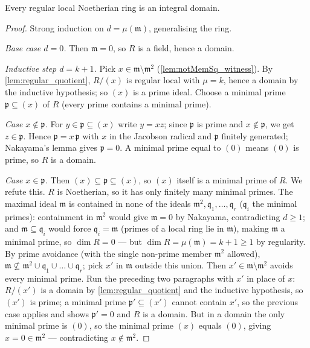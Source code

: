 \begin{theorem}
  \label{thm:regular_isDomain}
  \leanok
  Every regular local Noetherian ring is an integral domain.
\end{theorem}
\begin{proof}
  \leanok
  Strong induction on \(d = \mu(\mathfrak m)\), generalising the ring.

  \emph{Base case \(d = 0\).} Then \(\mathfrak m = 0\), so \(R\) is a field, hence a
  domain.

  \emph{Inductive step \(d = k + 1\).} Pick \(x \in \mathfrak m \setminus \mathfrak m^2\)
  (\ref{lem:notMemSq_witness}). By \ref{lem:regular_quotient}, \(R/(x)\) is regular
  local with \(\mu = k\), hence a domain by the inductive hypothesis; so \((x)\) is a
  prime ideal. Choose a minimal prime \(\mathfrak p \subseteq (x)\) of \(R\) (every
  prime contains a minimal prime).

  \emph{Case \(x \notin \mathfrak p\).} For \(y \in \mathfrak p \subseteq (x)\) write
  \(y = xz\); since \(\mathfrak p\) is prime and \(x \notin \mathfrak p\), we get
  \(z \in \mathfrak p\). Hence \(\mathfrak p = x\,\mathfrak p\) with
  \(x\) in the Jacobson radical and \(\mathfrak p\) finitely generated; Nakayama's lemma
  gives \(\mathfrak p = 0\). A minimal prime equal to \((0)\) means \((0)\) is prime, so
  \(R\) is a domain.

  \emph{Case \(x \in \mathfrak p\).} Then \((x) \subseteq \mathfrak p \subseteq (x)\),
  so \((x)\) itself is a minimal prime of \(R\). We refute this. \(R\) is Noetherian, so
  it has only finitely many minimal primes. The maximal ideal \(\mathfrak m\) is
  contained in none of the ideals \(\mathfrak m^2, \mathfrak q_1, \dots, \mathfrak q_r\)
  (\(\mathfrak q_i\) the minimal primes): containment in \(\mathfrak m^2\) would give
  \(\mathfrak m = 0\) by Nakayama, contradicting \(d \geq 1\); and
  \(\mathfrak m \subseteq \mathfrak q_i\) would force \(\mathfrak q_i = \mathfrak m\)
  (primes of a local ring lie in \(\mathfrak m\)), making \(\mathfrak m\) a minimal
  prime, so \(\dim R = 0\) --- but \(\dim R = \mu(\mathfrak m) = k + 1 \geq 1\) by
  regularity. By prime avoidance (with the single non-prime member \(\mathfrak m^2\)
  allowed), \(\mathfrak m \not\subseteq \mathfrak m^2 \cup \mathfrak q_1 \cup \dots \cup
  \mathfrak q_r\); pick \(x'\) in \(\mathfrak m\) outside this union. Then
  \(x' \in \mathfrak m \setminus \mathfrak m^2\) avoids every minimal prime. Run the
  preceding two paragraphs with \(x'\) in place of \(x\): \(R/(x')\) is a domain by
  \ref{lem:regular_quotient} and the inductive hypothesis, so \((x')\) is prime; a
  minimal prime \(\mathfrak p' \subseteq (x')\) cannot contain \(x'\), so the previous
  case applies and shows \(\mathfrak p' = 0\) and \(R\) is a domain. But in a domain the
  only minimal prime is \((0)\), so the minimal prime \((x)\) equals \((0)\), giving
  \(x = 0 \in \mathfrak m^2\) --- contradicting \(x \notin \mathfrak m^2\).
\end{proof}

